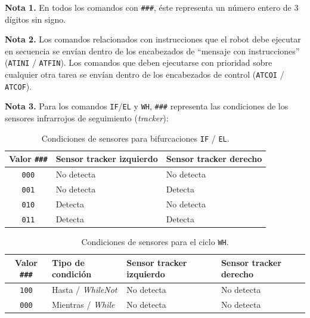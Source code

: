 \documentclass[12pt,a4paper]{article}
\begin{document}
\textbf{Nota 1.} En todos los comandos con \texttt{\#\#\#}, éste representa un número entero de 3 dígitos sin signo.

\textbf{Nota 2.} Los comandos relacionados con instrucciones que el robot debe ejecutar en secuencia se envían dentro de los encabezados de ``mensaje con instrucciones'' (\texttt{ATINI} / \texttt{ATFIN}). Los comandos que deben ejecutarse con prioridad sobre cualquier otra tarea se envían dentro de los encabezados de control (\texttt{ATCOI} / \texttt{ATCOF}).

\textbf{Nota 3.} Para los comandos \texttt{IF}/\texttt{EL} y \texttt{WH}, \texttt{\#\#\#} representa las condiciones de los sensores infrarrojos de seguimiento (\textit{tracker}):

\begin{table}[H]
    \centering
    \renewcommand{\arraystretch}{1.2}
    \begin{tabularx}{0.55\textwidth}{@{} c X X @{}}
        \toprule
        \textbf{Valor \texttt{\#\#\#}} & \textbf{Sensor tracker izquierdo} & \textbf{Sensor tracker derecho} \\
        \midrule
        \texttt{000} & No detecta & No detecta \\
        \texttt{001} & No detecta & Detecta \\
        \texttt{010} & Detecta & No detecta \\
        \texttt{011} & Detecta & Detecta \\
        \bottomrule
    \end{tabularx}
    \caption{Condiciones de sensores para bifurcaciones \texttt{IF} / \texttt{EL}.}
\end{table}

\begin{table}[H]
    \centering
    \renewcommand{\arraystretch}{1.2}
    \begin{tabularx}{0.8\textwidth}{@{} c l X X @{}}
        \toprule
        \textbf{Valor \texttt{\#\#\#}} & \textbf{Tipo de condición} & \textbf{Sensor tracker   izquierdo} & \textbf{Sensor tracker   derecho} \\
        \midrule
        \texttt{100} & Hasta / \textit{WhileNot} & No detecta & No detecta \\
        \texttt{000} & Mientras / \textit{While} & No detecta & No detecta \\
        \bottomrule
    \end{tabularx}
    \caption{Condiciones de sensores para el ciclo \texttt{WH}.}
\end{table}
\end{document}
